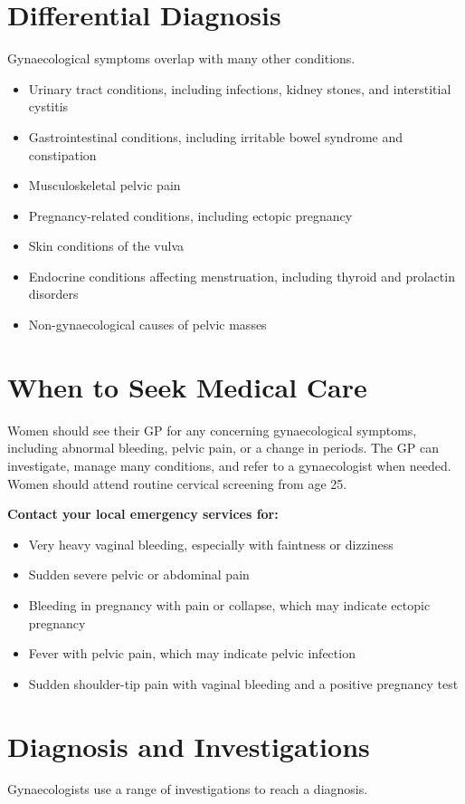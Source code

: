 \section*{Differential Diagnosis}
Gynaecological symptoms overlap with many other conditions.

\begin{itemize}
    \item Urinary tract conditions, including infections, kidney stones, and interstitial cystitis
    \item Gastrointestinal conditions, including irritable bowel syndrome and constipation
    \item Musculoskeletal pelvic pain
    \item Pregnancy-related conditions, including ectopic pregnancy
    \item Skin conditions of the vulva
    \item Endocrine conditions affecting menstruation, including thyroid and prolactin disorders
    \item Non-gynaecological causes of pelvic masses
\end{itemize}

\section*{When to Seek Medical Care}
Women should see their GP for any concerning gynaecological symptoms, including abnormal bleeding, pelvic pain, or a change in periods. The GP can investigate, manage many conditions, and refer to a gynaecologist when needed. Women should attend routine cervical screening from age 25.

\textbf{Contact your local emergency services for:}
\begin{itemize}
    \item Very heavy vaginal bleeding, especially with faintness or dizziness
    \item Sudden severe pelvic or abdominal pain
    \item Bleeding in pregnancy with pain or collapse, which may indicate ectopic pregnancy
    \item Fever with pelvic pain, which may indicate pelvic infection
    \item Sudden shoulder-tip pain with vaginal bleeding and a positive pregnancy test
\end{itemize}

\section*{Diagnosis and Investigations}
Gynaecologists use a range of investigations to reach a diagnosis.

